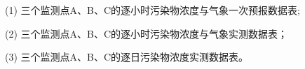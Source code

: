 \documentclass[a4paper,10pt]{my_paper}
\numberwithin{equation}{section}
\begin{document}
(1) 三个监测点A、B、C的逐小时污染物浓度与气象一次预报数据表;

(2) 三个监测点A、B、C的逐小时污染物浓度与气象实测数据表；

(3) 三个监测点A、B、C的逐日污染物浓度实测数据表。





\end{document}
